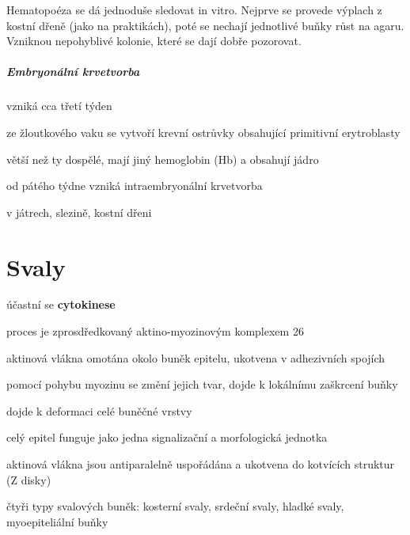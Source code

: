 \documentclass[DIV=8]{scrreprt}
\begin{document}
Hematopoéza se dá jednoduše sledovat in vitro. Nejprve se provede výplach z kostní dřeně (jako na praktikách), poté se nechají jednotlivé buňky růst na agaru. Vzniknou nepohyblivé kolonie, které se dají dobře pozorovat.

\paragraph{Embryonální krvetvorba}
\begin{myItemize}[nosep]
    \item vzniká cca třetí týden
\begin{myItemize}[nosep]
    \item ze žloutkového vaku se vytvoří krevní ostrůvky obsahující primitivní erytroblasty
    \item větší než ty dospělé, mají jiný hemoglobin (Hb) a obsahují jádro
\end{myItemize}

    \item od pátého týdne vzniká intraembryonální krvetvorba
\begin{myItemize}[nosep]
    \item v játrech, slezině, kostní dřeni
\end{myItemize}

\end{myItemize}



\chapter{Svaly} \label{Svaly}


\begin{myItemize}[nosep]
    \item účastní se \textbf{cytokinese}
\begin{myItemize}[nosep]
    \item proces je zprosdředkovaný aktino-myozinovým komplexem 26
    \item aktinová vlákna omotána okolo buněk epitelu, ukotvena v adhezivních spojích
    \item pomocí pohybu myozinu se změní jejich tvar, dojde k lokálnímu zaškrcení buňky
    \item dojde k deformaci celé buněčné vrstvy
\end{myItemize}

    \item celý epitel funguje jako jedna signalizační a morfologická jednotka
    \item aktinová vlákna jsou antiparalelně uspořádána a ukotvena do kotvících struktur (Z disky)
    \item čtyři typy svalových buněk: kosterní svaly, srdeční svaly, hladké svaly, myoepiteliální buňky
\end{myItemize}
\end{document}

